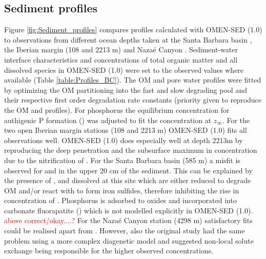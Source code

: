 \documentclass[gmd, manuscript]{copernicus}
\begin{document}
\subsection{Sediment profiles}
Figure \ref{fig:Sediment_profiles} compares profiles calculated with OMEN-SED (1.0) to observations from different ocean depths taken at the Santa Barbara basin \citep[585 m, ][]{reimers_porewater_1996}, 
the Iberian margin (108 and 2213 m) and Naza\'e Canyon \citep[4298 m, ][]{epping_oxidation_2002}. 
Sediment-water interface characteristics and concentrations of total organic matter and all dissolved species in OMEN-SED (1.0) were set to the observed values where available (Table \ref{table:Profiles_BC}). 
The OM and pore water profiles were fitted by optimizing the OM partitioning into the fast and slow degrading pool and their respective first order degradation rate constants (priority given to reproduce the OM and  profiles). 
For phosphorus the equilibrium concentration for authigenic P formation () was adjusted to fit the  concentration at $z_\infty$. 
For the two open Iberian margin stations (108 and 2213 m) OMEN-SED (1.0) fits all observations well. OMEN-SED (1.0) does especially well at depth 2213m by reproducing the deep  penetration and the subsurface maximum in  
concentration due to the nitrification of . 
For the Santa Barbara basin (585 m) a misfit is observed for  and  in the upper 20 cm of the sediment. This can be explained by the presence of ,  and dissolved  at this site which 
are either reduced to degrade OM and/or react with  to form iron sulfides, therefore inhibiting the rise in concentration of  \citep{reimers_porewater_1996}. 
Phosphorus is adsorbed to  oxides and incorporated into carbonate fluorapatite () which is not modelled explicitly in OMEN-SED (1.0).  \textcolor{red}{above correct/okay....?}
For the Naza\'e Canyon station (4298 m) satisfactory fits could be realised apart from . However, also the original study \citep{epping_oxidation_2002} had the same problem using a more 
complex diagenetic model and suggested non-local solute exchange being responsible for the higher observed  concentrations.
\end{document}
